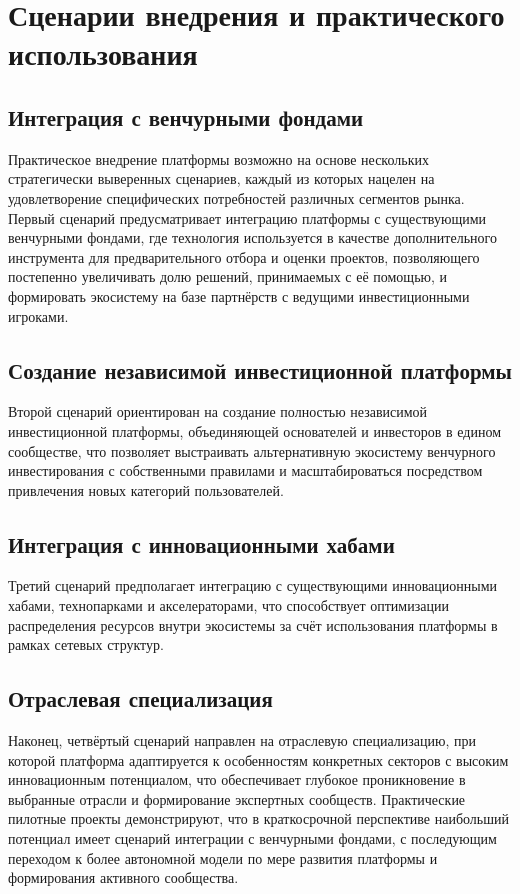 \documentclass[
    candidate, %
    subf, %
    dotsinheaders=false,
]{disser}
\begin{document}
\section{Сценарии внедрения и практического использования}

\subsection{Интеграция с венчурными фондами}
Практическое внедрение платформы возможно на основе нескольких стратегически выверенных сценариев, каждый из которых нацелен на удовлетворение специфических потребностей различных сегментов рынка. Первый сценарий предусматривает интеграцию платформы с существующими венчурными фондами, где технология используется в качестве дополнительного инструмента для предварительного отбора и оценки проектов, позволяющего постепенно увеличивать долю решений, принимаемых с её помощью, и формировать экосистему на базе партнёрств с ведущими инвестиционными игроками.

\subsection{Создание независимой инвестиционной платформы}
Второй сценарий ориентирован на создание полностью независимой инвестиционной платформы, объединяющей основателей и инвесторов в едином сообществе, что позволяет выстраивать альтернативную экосистему венчурного инвестирования с собственными правилами и масштабироваться посредством привлечения новых категорий пользователей.

\subsection{Интеграция с инновационными хабами}
Третий сценарий предполагает интеграцию с существующими инновационными хабами, технопарками и акселераторами, что способствует оптимизации распределения ресурсов внутри экосистемы за счёт использования платформы в рамках сетевых структур.

\subsection{Отраслевая специализация}
Наконец, четвёртый сценарий направлен на отраслевую специализацию, при которой платформа адаптируется к особенностям конкретных секторов с высоким инновационным потенциалом, что обеспечивает глубокое проникновение в выбранные отрасли и формирование экспертных сообществ. Практические пилотные проекты демонстрируют, что в краткосрочной перспективе наибольший потенциал имеет сценарий интеграции с венчурными фондами, с последующим переходом к более автономной модели по мере развития платформы и формирования активного сообщества.
\end{document}
